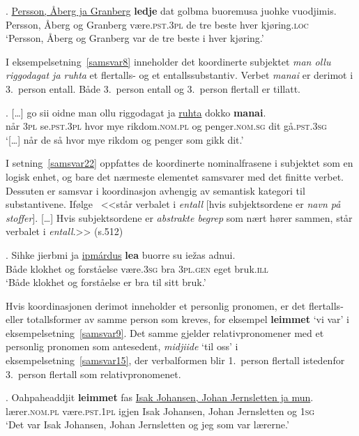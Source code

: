 \documentclass{flammie}
\begin{document}
\exg. \underline{Persson, Åberg ja Granberg} \textbf{ledje} dat golbma buoremusa juohke vuodjimis.\label{samsvar7}\\
{Persson, Åberg og Granberg} være\textsc{.pst.3pl} de tre beste hver kjøring\textsc{.loc}\\
`Persson, Åberg og Granberg {var} de tre beste i hver kjøring.'

I eksempelsetning~\ref{samsvar8} inneholder det koordinerte subjektet
\textit{man ollu riggodagat ja ruhta} et flertalls- og et entallssubstantiv.
Verbet \textit{manai} er derimot i 3.\ person entall. Både 3.\ person entall og
3.\ person flertall er tillatt.

\exg. [\ldots] go sii oidne man ollu riggodagat ja \underline{ruhta} dokko \textbf{manai}.\label{samsvar8}\\
[\ldots] når \textsc{3pl} se\textsc{.pst.3pl} hvor mye rikdom\textsc{.nom.pl} og penger\textsc{.nom.sg} dit gå\textsc{.pst.3sg}\\
`[\ldots] når de så hvor mye rikdom og penger som gikk dit.'

I setning~\ref{samsvar22} oppfattes de koordinerte nominalfrasene i subjektet
som en logisk enhet, og bare det nærmeste elementet samsvarer med det finitte
verbet. Dessuten er samsvar i koordinasjon avhengig av semantisk kategori til
substantivene. Ifølge~\cite{Nickel1994samisk} <<står verbalet i \textit{entall}
[hvis subjektsordene er \textit{navn på stoffer}]. [\ldots] Hvis subjektsordene
er \textit{abstrakte begrep} som nært hører sammen, står verbalet i
\textit{entall}.>> (s.512)

\exg. Sihke jierbmi ja \underline{ipmárdus} \textbf{lea} buorre su iežas adnui.\label{samsvar22}\\
Både klokhet og forståelse være\textsc{.3sg} bra \textsc{3pl.gen} eget  bruk\textsc{.ill}\\
`Både klokhet og forståelse er bra til sitt bruk.'

Hvis koordinasjonen derimot inneholder et personlig pronomen, er det flertalls-
eller totallsformer av samme person som kreves, for eksempel \textbf{leimmet}
`vi var' i eksempelsetning~\ref{samsvar9}. Det samme gjelder relativpronomener
med et personlig pronomen som antesedent, \textit{midjiide} `til oss' i
eksempelsetning~\ref{samsvar15}, der verbalformen blir 1.\ person flertall
istedenfor 3.\ person flertall som relativpronomenet.


\exg. Oahpaheaddjit \textbf{leimmet} fas \underline{Isak Johansen, Johan Jernsletten ja mun}.\label{samsvar9}\\
lærer\textsc{.nom.pl} være\textsc{.pst.1pl} igjen {Isak Johansen, Johan Jernsletten og \textsc{1sg}}\\
`Det {var} Isak Johansen, Johan Jernsletten og jeg som var lærerne.'
\end{document}
